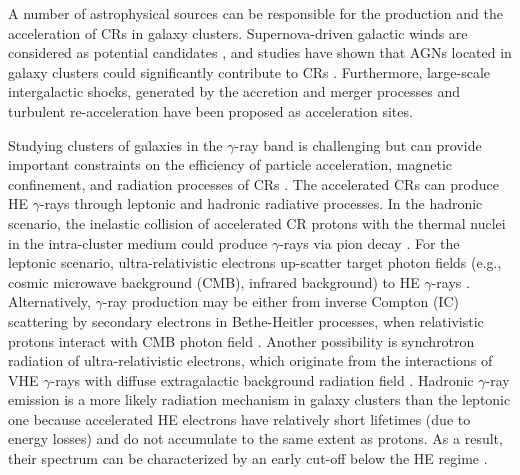 \documentclass[fleqn,usenatbib]{mnras}
\begin{document}
A number of astrophysical sources can be responsible for the production and the acceleration of CRs in galaxy clusters.
Supernova-driven galactic winds are considered as potential candidates \citep{1996SSRv...75..279V}, and studies have shown that AGNs located in galaxy clusters could significantly contribute to CRs \citep{1997ApJ...477..560E,2002MNRAS.332..215A, 2007MNRAS.382..466H}.
Furthermore, large-scale intergalactic shocks, generated by the accretion and merger processes \citep{1998APh.....9..227C,2003ApJ...593..599R,2003ApJ...583..695G,2004APh....20..579G} and turbulent re-acceleration \citep{2005MNRAS.363.1173B} have been proposed as acceleration sites.

Studying clusters of galaxies in the $\gamma$-ray band is challenging but can provide important constraints on the efficiency of particle acceleration, magnetic confinement, and radiation processes of CRs \citep{2007IJMPA..22..681B}.
The accelerated CRs can produce HE $\gamma$-rays through leptonic and hadronic radiative processes.
In the hadronic scenario, the inelastic collision of accelerated CR protons with the thermal nuclei in the intra-cluster medium could produce $\gamma$-rays via pion decay \citep{1980ApJ...239L..93D}.
For the leptonic scenario, ultra-relativistic electrons up-scatter target photon fields (e.g., cosmic microwave background (CMB), infrared background) to HE $\gamma$-rays \citep{2000ApJ...535...45A,2003APh....19..679G}.
Alternatively, $\gamma$-ray production may be either from inverse Compton (IC) scattering by secondary electrons in Bethe-Heitler processes, when relativistic protons interact with CMB photon field \citep{2005ApJ...628L...9I, 2008PhRvD..78c4013K}.
Another possibility is synchrotron radiation of ultra-relativistic electrons, which originate from the interactions of VHE $\gamma$-rays with diffuse extragalactic background radiation field \citep{2004A&A...417..391T}.   
Hadronic $\gamma$-ray emission is a more likely radiation mechanism in galaxy clusters than the leptonic one because accelerated HE electrons have relatively short lifetimes (due to energy losses) and do not accumulate to the same extent as protons.
As a result, their spectrum can be characterized by an early cut-off below the HE regime \citep{2000ApJ...535...45A}. 
\end{document}
